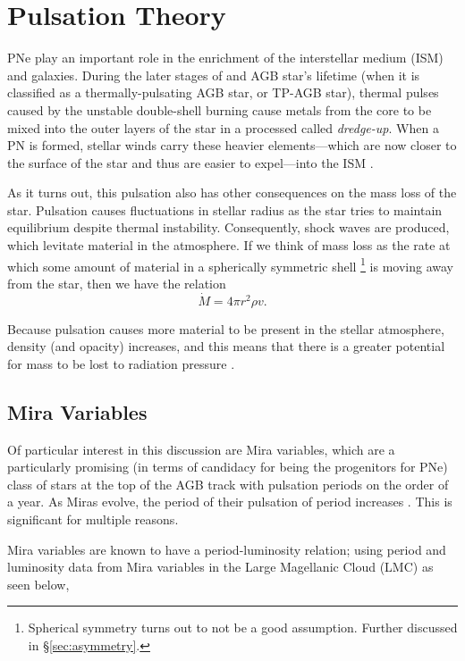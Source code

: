 \documentclass[twocolumn]{aastex63}
\begin{document}

\section{Pulsation Theory} \label{sec:pulsation}
PNe play an important role in the enrichment of the interstellar medium (ISM) and galaxies. During the later stages of and AGB star's lifetime (when it is classified as a thermally-pulsating AGB star, or TP-AGB star), thermal pulses caused by the unstable double-shell burning cause metals from the core to be mixed into the outer layers of the star in a processed called \textit{dredge-up}. When a PN is formed, stellar winds carry these heavier elements—which are now closer to the surface of the star and thus are easier to expel—into the ISM \citep{iben}. 

As it turns out, this pulsation also has other consequences on the mass loss of the star. Pulsation causes fluctuations in stellar radius as the star tries to maintain equilibrium despite thermal instability. Consequently, shock waves are produced, which levitate material in the atmosphere. If we think of mass loss as the rate at which some amount of material in a spherically symmetric shell \footnote{Spherical symmetry turns out to not be a good assumption. Further discussed in \S \ref{sec:asymmetry}.} is moving away from the star, then we have the relation
\begin{equation*}
    \dot M = 4\pi r^2 \rho v.
\end{equation*}

Because pulsation causes more material to be present in the stellar atmosphere, density (and opacity) increases, and this means that there is a greater potential for mass to be lost to radiation pressure \citep{liljegren}. 

\subsection{Mira Variables} \label{subsec:mira}

Of particular interest in this discussion are Mira variables, which are a particularly promising (in terms of candidacy for being the progenitors for PNe) class of stars at the top of the AGB track with pulsation periods on the order of a year. As Miras evolve, the period of their pulsation of period increases \citep{fadeyev}. This is significant for multiple reasons. 

Mira variables are known to have a period-luminosity relation; using period and luminosity data from Mira variables in the Large Magellanic Cloud (LMC) as seen below,
\end{document}
